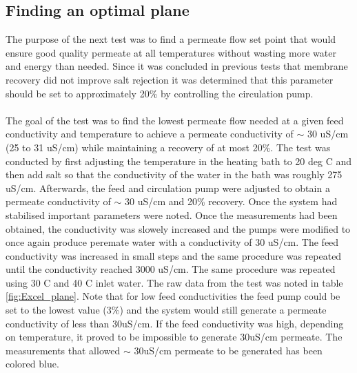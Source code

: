 \subsection{Finding an optimal plane}

The purpose of the next test was to find a permeate flow set point that would ensure good quality permeate at all temperatures without wasting more water and energy than needed. Since it was concluded in previous tests that membrane recovery did not improve salt rejection it was determined that this parameter should be set to approximately 20\% by controlling the circulation pump. \\
\\
The goal of the test was to find the lowest permeate flow needed at a given feed conductivity and temperature to achieve a permeate conductivity of  $\sim$ 30 uS/cm (25 to 31 uS/cm) while maintaining a recovery of at most 20\%. The test was conducted by first adjusting the temperature in the heating bath to 20 deg C and then add salt so that the conductivity of the water in the bath was roughly 275 uS/cm. Afterwards, the feed and circulation pump were adjusted to obtain a  permeate conductivity of  $\sim$ 30 uS/cm and 20\% recovery. Once the system had stabilised important parameters were noted. Once the measurements had been obtained, the conductivity was slowely increased and the pumps were modified to once again produce peremate water with a conductivity of 30 uS/cm. The feed conductivity was increased in small steps and the same procedure was repeated until the conductivity reached 3000 uS/cm. The same procedure was repeated using 30 C and 40 C inlet water. The raw data from the test was noted in table \ref{fig:Excel_plane}. Note that for low feed conductivities the feed pump could be set to the lowest value (3\%) and the system would still generate a permeate conductivity of less than 30uS/cm. If the feed conductivity was high, depending on temperature, it proved to be impossible to generate 30uS/cm permeate. The measurements that allowed  $\sim$ 30uS/cm permeate to be generated has been colored blue.

